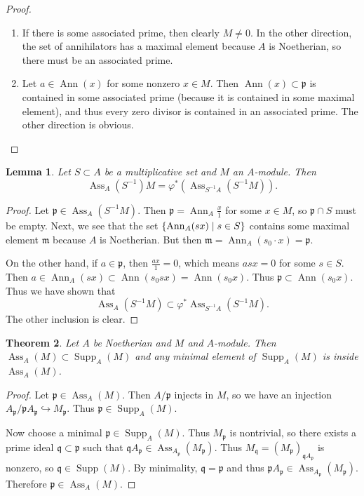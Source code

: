 \documentclass[leqno, openany]{memoir}
\newtheorem{thm}{Theorem}[section]
\newtheorem{lem}[thm]{Lemma}
\theoremstyle{definition}
\theoremstyle{remark}
\theoremstyle{plain}
\theoremstyle{definition}
\theoremstyle{remark}
\newcommand{\mf}[1]{\mathfrak{#1}}
\DeclareMathOperator{\Supp}{Supp}
\DeclareMathOperator{\Ann}{Ann}
\DeclareMathOperator{\Ass}{Ass}
\begin{document}
\begin{proof} \begin{enumerate} \item If there is some associated prime, then
    clearly $M \neq 0$. In the other direction, the set of annihilators has a
    maximal element because $A$ is Noetherian, so there must be an associated
    prime.  \item Let $a \in \Ann(x)$ for some nonzero $x \in M$. Then $\Ann(x)
    \subset \mf{p}$ is contained in some associated prime (because it is
    contained in some maximal element), and thus every zero divisor is
    contained in an associated prime. The other direction is obvious. \qedhere
    \end{enumerate} \end{proof}

\begin{lem} Let $S \subset A$ be a multiplicative set and $M$ an $A$-module.
    Then \[ \Ass_A(S^{-1})M = \varphi^*(\Ass_{S^{-1}A}(S^{-1}M)). \] \end{lem}

\begin{proof} Let $\mf{p} \in \Ass_A(S^{-1}M)$. Then $\mf{p} = \Ann_A
    \frac{x}{1}$ for some $x \in M$, so $\mf{p} \cap S$ must be empty. Next, we
    see that the set $\qty{\Ann_A(sx) \mid s \in S}$ contains some maximal
    element $\mf{m}$ because $A$ is Noetherian. But then $\mf{m} = \Ann_A(s_0
    \cdot x) = \mf{p}$.

    On the other hand, if $a \in \mf{p}$, then $\frac{ax}{1} = 0$, which means
    $asx = 0$ for some $s \in S$. Then $a \in \Ann_A(sx) \subset \Ann(s_0 sx) =
    \Ann(s_0 x)$. Thus $\mf{p} \subset \Ann(s_0 x)$. Thus we have shown that \[
    \Ass_A(S^{-1}M) \subset \varphi^* \Ass_{S^{-1}A} (S^{-1}M). \] The other
inclusion is clear.  \end{proof}

\begin{thm} Let $A$ be Noetherian and $M$ and $A$-module. Then $\Ass_A(M)
\subset \Supp_A(M)$ and any minimal element of $\Supp_A(M)$ is inside
$\Ass_A(M)$.  \end{thm}

\begin{proof} Let $\mf{p} \in \Ass_A(M)$. Then $A/\mf{p}$ injects in $M$, so we
    have an injection $A_{\mf{p}} / \mf{p}A_{\mf{p}} \hookrightarrow
    M_{\mf{p}}$. Thus $\mf{p} \in \Supp_A(M)$.

    Now choose a minimal $\mf{p} \in \Supp_A(M)$. Thus $M_{\mf{p}}$ is
nontrivial, so there exists a prime ideal $\mf{q} \subset \mf{p}$ such that
$\mf{q} A_{\mf{p}} \in \Ass_{A_{\mf{p}}}(M_{\mf{p}})$. Thus $M_{\mf{q}} =
(M_{\mf{p}})_{\mf{q}A_{\mf{p}}}$ is nonzero, so $\mf{q} \in \Supp(M)$. By
minimality, $\mf{q} = \mf{p}$ and thus $\mf{p}A_{\mf{p}} \in \Ass_{A_{\mf{p}}}
(M_{\mf{p}})$. Therefore $\mf{p} \in \Ass_A(M)$.  \end{proof}
\end{document}
